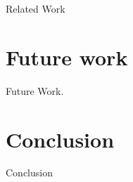 \documentclass[conference]{IEEEtran}
\begin{document}
Related Work



\section{Future work}
\label{sec: futurework}

Future Work.

\section{Conclusion}
\label{sec: conclusion}

Conclusion




\balance



\end{document}
